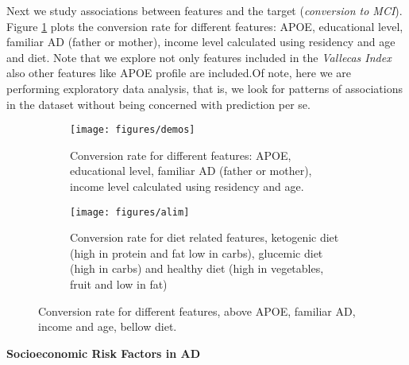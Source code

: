 \documentclass[11pt]{article}
\theoremstyle{definition}
\theoremstyle{remark}
\begin{document}
Next we study associations between features and the target (\emph{conversion to MCI}). 
Figure \ref{fig:demosalime} plots the conversion rate for different features: APOE, educational level, familiar AD (father or mother), income level calculated using residency and age and diet. Note that we explore not only features included in the \emph{Vallecas Index} also other features like APOE profile are included.Of note, here we are performing exploratory data analysis, that is, we look for patterns of associations in the dataset without being concerned with prediction per se.

\begin{figure}[H]
    \centering
    \begin{subfigure}[t]{\textwidth}
        \centering
        \texttt{[image: figures/demos]}
        \caption{Conversion rate for different features: APOE, educational level, familiar AD (father or mother), income level calculated using residency and age.}

    \end{subfigure}
    
    \begin{subfigure}[t]{\textwidth}
        \centering
        \texttt{[image: figures/alim]}
        \caption{Conversion rate for diet related features, ketogenic diet (high in protein and fat low in carbs), glucemic diet (high in carbs) and healthy diet (high in vegetables, fruit and low in fat)}
    \end{subfigure}%
    \caption{Conversion rate for different features, above APOE, familiar AD, income and age, bellow diet.} \label{fig:demosalime}
\end{figure}

\textbf{Socioeconomic Risk Factors in AD}
\end{document}
